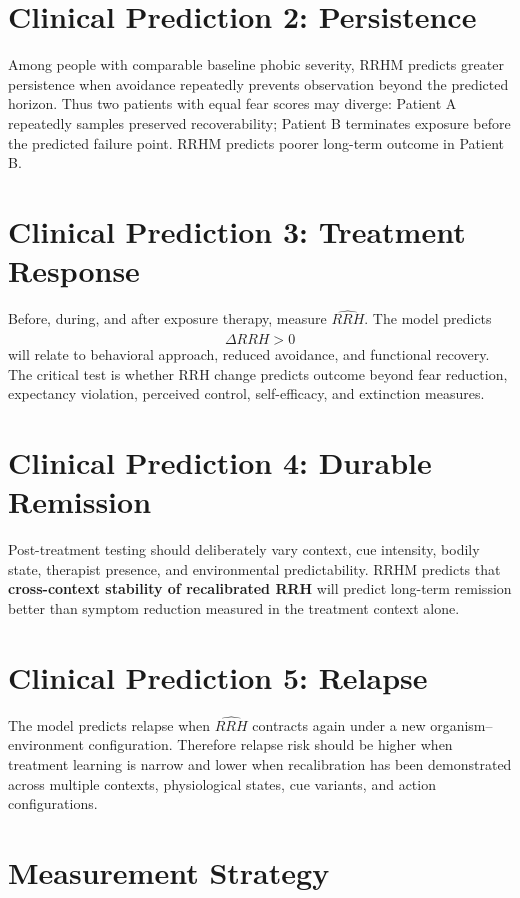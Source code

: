 \documentclass[11pt]{article}
\begin{document}
\section{Clinical Prediction 2: Persistence}

Among people with comparable baseline phobic severity, RRHM predicts greater persistence when avoidance repeatedly prevents observation beyond the predicted horizon. Thus two patients with equal fear scores may diverge: Patient A repeatedly samples preserved recoverability; Patient B terminates exposure before the predicted failure point. RRHM predicts poorer long-term outcome in Patient B.

\section{Clinical Prediction 3: Treatment Response}

Before, during, and after exposure therapy, measure $\widehat{RRH}$. The model predicts
\[
\Delta\widehat{RRH}>0
\]
will relate to behavioral approach, reduced avoidance, and functional recovery. The critical test is whether RRH change predicts outcome beyond fear reduction, expectancy violation, perceived control, self-efficacy, and extinction measures.

\section{Clinical Prediction 4: Durable Remission}

Post-treatment testing should deliberately vary context, cue intensity, bodily state, therapist presence, and environmental predictability. RRHM predicts that \textbf{cross-context stability of recalibrated RRH} will predict long-term remission better than symptom reduction measured in the treatment context alone.

\section{Clinical Prediction 5: Relapse}

The model predicts relapse when $\widehat{RRH}$ contracts again under a new organism--environment configuration. Therefore relapse risk should be higher when treatment learning is narrow and lower when recalibration has been demonstrated across multiple contexts, physiological states, cue variants, and action configurations.

\section{Measurement Strategy}
\end{document}
